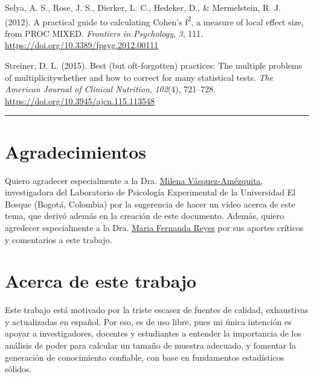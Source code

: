 \documentclass[
]{article}
\newlength{\cslhangindent}
\newlength{\cslentryspacingunit} %
\newenvironment{CSLReferences}[2] %
 {%
  \setlength{\parindent}{0pt}
  \ifodd #1
  \let\oldpar\par
  \def\par{\hangindent=\cslhangindent\oldpar}
  \fi
  \setlength{\parskip}{#2\cslentryspacingunit}
 }%
 {}
\begin{document}
\begin{CSLReferences}{1}{0}
\leavevmode{}%
Selya, A. S., Rose, J. S., Dierker, L. C., Hedeker, D., \& Mermelstein,
R. J. (2012). A practical guide to calculating {Cohen}'s
f{\textsuperscript{2}}, a measure of local effect size, from {PROC
MIXED}. \emph{Frontiers in Psychology}, \emph{3}, 111.
\url{https://doi.org/10.3389/fpsyg.2012.00111}

\leavevmode{}%
Streiner, D. L. (2015). Best (but oft-forgotten) practices: The multiple
problems of multiplicity\textemdash{}whether and how to correct for many
statistical tests. \emph{The American Journal of Clinical Nutrition},
\emph{102}(4), 721--728. \url{https://doi.org/10.3945/ajcn.115.113548}

\end{CSLReferences}

\begin{center}\rule{0.5\linewidth}{0.5pt}\end{center}

\hypertarget{agradecimientos}{%
\section*{Agradecimientos}\label{agradecimientos}}

Quiero agradecer especialmente a la Dra.
\href{https://www.researchgate.net/profile/Milena_Vasquez-Amezquita}{Milena
Vásquez-Amézquita}, investigadora del Laboratorio de Psicología
Experimental de la Universidad El Bosque (Bogotá, Colombia) por la
sugerencia de hacer un video acerca de este tema, que derivó además en
la creación de este documento. Además, quiero agredecer especialmente a
la Dra. \href{https://www.researchgate.net/profile/Maria_Reyes12}{Maria
Fernanda Reyes} por sus aportes críticos y comentarios a este trabajo.

\hypertarget{acerca-de-este-trabajo}{%
\section*{Acerca de este trabajo}\label{acerca-de-este-trabajo}}

Este trabajo está motivado por la triste escasez de fuentes de calidad,
exhaustivas y actualizadas en español. Por eso, es de uso libre, pues mi
única intención es apoyar a investigadores, docentes y estudiantes a
entender la importancia de los análisis de poder para calcular un tamaño
de muestra adecuado, y fomentar la generación de conocimiento confiable,
con base en fundamentos estadísticos sólidos.
\end{document}

